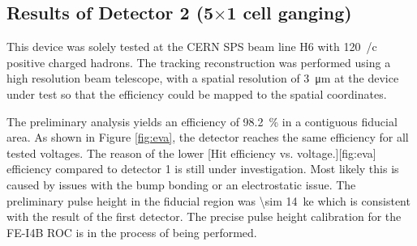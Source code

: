 \subsection{Results of Detector 2 (5$\times$1 cell ganging)}
This device was solely tested at the CERN SPS beam line H6 with \SI{120}{\gev/c} positive charged hadrons. The tracking reconstruction was performed using a high resolution beam telescope, with a spatial resolution of \SI{3}{\micro\meter} at the device under test so that the efficiency could be mapped to the spatial coordinates. \par
The preliminary analysis yields an efficiency of \SI{98.2}{\%} in a contiguous fiducial area. As shown in Figure \ref{fig:eva}, the detector reaches the same efficiency for all tested voltages. %
The reason of the lower 
[Hit efficiency vs. voltage.][fig:eva]
efficiency compared to detector 1 is still under investigation. Most likely this is caused by issues with the bump bonding or an electrostatic issue. The preliminary pulse height in the fiducial region was \SI{\sim 14}{\kilo e} which is consistent with the result of the first detector. The precise pulse height calibration for the FE-I4B \ac{ROC} is in the process of being performed.
